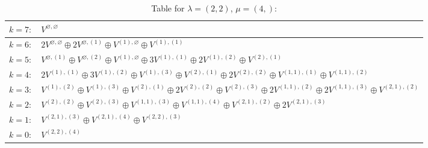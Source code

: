 \documentclass[a4paper,12pt]{article}
\begin{document}
\renewcommand{\arraystretch}{1.6} 
\begin{table}[H]
\centering
\caption{Table for $\lambda = (2, 2)$, $\mu = (4,)$:}
\begin{tabular}{|>{\centering\arraybackslash}p{15cm}|}
\hline
 $k = 7: \quad V^{\varnothing, \varnothing} $ \\ \hline
 $k = 6: \quad 2 V^{\varnothing, \varnothing} \oplus 2 V^{\varnothing, (1)} \oplus V^{(1), \varnothing} \oplus V^{(1), (1)} $ \\ \hline
 $k = 5: \quad V^{\varnothing, (1)} \oplus V^{\varnothing, (2)} \oplus V^{(1), \varnothing} \oplus 3 V^{(1), (1)} \oplus 2 V^{(1), (2)} \oplus V^{(2), (1)} $ \\ \hline
 $k = 4: \quad 2 V^{(1), (1)} \oplus 3 V^{(1), (2)} \oplus V^{(1), (3)} \oplus V^{(2), (1)} \oplus 2 V^{(2), (2)} \oplus V^{(1, 1), (1)} \oplus V^{(1, 1), (2)} $ \\ \hline
 $k = 3: \quad V^{(1), (2)} \oplus V^{(1), (3)} \oplus V^{(2), (1)} \oplus 2 V^{(2), (2)} \oplus V^{(2), (3)} \oplus 2 V^{(1, 1), (2)} \oplus 2 V^{(1, 1), (3)} \oplus V^{(2, 1), (2)} $ \\ \hline
 $k = 2: \quad V^{(2), (2)} \oplus V^{(2), (3)} \oplus V^{(1, 1), (3)} \oplus V^{(1, 1), (4)} \oplus V^{(2, 1), (2)} \oplus 2 V^{(2, 1), (3)} $ \\ \hline
 $k = 1: \quad V^{(2, 1), (3)} \oplus V^{(2, 1), (4)} \oplus V^{(2, 2), (3)} $ \\ \hline
 $k = 0: \quad V^{(2, 2), (4)} $ \\ \hline
\end{tabular}
\end{table}
\end{document}
